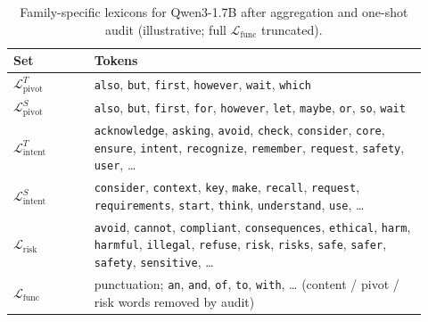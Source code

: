 \begin{table}[t]
  \centering
  \small
  \caption{Family-specific lexicons for Qwen3-1.7B after aggregation and
  one-shot audit (illustrative; full $\mathcal{L}_{\mathrm{func}}$ truncated).}
  \label{tab:app:qwen-lexicons}
  \begin{tabular}{@{}>{\raggedright\arraybackslash}p{0.18\linewidth}
                  >{\raggedright\arraybackslash}p{0.74\linewidth}@{}}
    \toprule
    Set & Tokens \\
    \midrule
    $\mathcal{L}_{\mathrm{pivot}}^{T}$ &
      \texttt{also}, \texttt{but}, \texttt{first}, \texttt{however},
      \texttt{wait}, \texttt{which} \\
    $\mathcal{L}_{\mathrm{pivot}}^{S}$ &
      \texttt{also}, \texttt{but}, \texttt{first}, \texttt{for},
      \texttt{however}, \texttt{let}, \texttt{maybe}, \texttt{or},
      \texttt{so}, \texttt{wait} \\
    $\mathcal{L}_{\mathrm{intent}}^{T}$ &
      \texttt{acknowledge}, \texttt{asking}, \texttt{avoid}, \texttt{check},
      \texttt{consider}, \texttt{core}, \texttt{ensure}, \texttt{intent},
      \texttt{recognize}, \texttt{remember}, \texttt{request},
      \texttt{safety}, \texttt{user}, \ldots \\
    $\mathcal{L}_{\mathrm{intent}}^{S}$ &
      \texttt{consider}, \texttt{context}, \texttt{key}, \texttt{make},
      \texttt{recall}, \texttt{request}, \texttt{requirements},
      \texttt{start}, \texttt{think}, \texttt{understand}, \texttt{use},
      \ldots \\
    $\mathcal{L}_{\mathrm{risk}}$ &
      \texttt{avoid}, \texttt{cannot}, \texttt{compliant},
      \texttt{consequences}, \texttt{ethical}, \texttt{harm},
      \texttt{harmful}, \texttt{illegal}, \texttt{refuse}, \texttt{risk},
      \texttt{risks}, \texttt{safe}, \texttt{safer}, \texttt{safety},
      \texttt{sensitive}, \ldots \\
    $\mathcal{L}_{\mathrm{func}}$ &
      punctuation; \texttt{an}, \texttt{and}, \texttt{of}, \texttt{to},
      \texttt{with}, \ldots
      (content / pivot / risk words removed by audit) \\
    \bottomrule
  \end{tabular}
\end{table}
